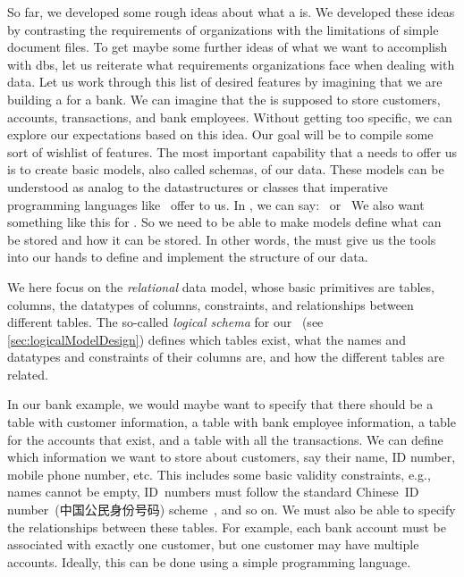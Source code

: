 %
\label{sec:features}%
%
So far, we developed some rough ideas about what a  is.
We developed these ideas by contrasting the requirements of organizations with the limitations of simple document files.
To get maybe some further ideas of what we want to accomplish with \glspl{db}, let us reiterate what requirements organizations face when dealing with data.
Let us work through this list of desired features by imagining that we are building a  for a bank.
We can imagine that the  is supposed to store customers, accounts, transactions, and bank employees.
Without getting too specific, we can explore our expectations based on this idea.
Our goal will be to compile some sort of wishlist of features.%
%
%
The most important capability that a  needs to offer us is to create basic models, also called schemas, of our data.
These models can be understood as analog to the datastructures or classes that imperative programming languages like \python\ offer to us.
In \python, we can say:~
or~
We also want something like this for .
So we need to be able to make models define what can be stored and how it can be stored.
In other words, the  must give us the tools into our hands to define and implement the structure of our data.

We here focus on the \emph{relational} data model, whose basic primitives are tables, columns, the datatypes of columns, constraints, and relationships between different tables.
The so-called \emph{logical schema} for our ~(see \cref{sec:logicalModelDesign}) defines which tables exist, what the names and datatypes and constraints of their columns are, and how the different tables are related.

In our bank example, we would maybe want to specify that there should be a table with customer information, a table with bank employee information, a table for the accounts that exist, and a table with all the transactions.
We can define which information we want to store about customers, say their name, ID number, mobile phone number, etc.
This includes some basic validity constraints, e.g., names cannot be empty, ID~numbers must follow the standard Chinese~ID number~(中国公民身份号码) scheme~\cite{GB116431999CIN}, and so on.
We must also be able to specify the relationships between these tables.
For example, each bank account must be associated with exactly one customer, but one customer may have multiple accounts.
Ideally, this can be done using a simple programming language.

